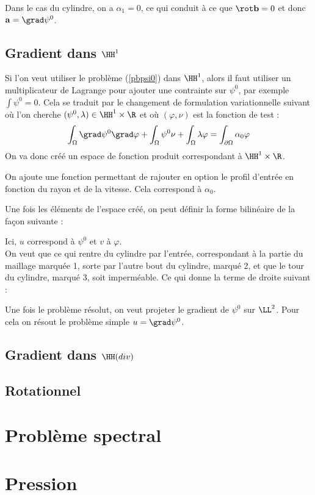 Dans le cas du cylindre, on a $\alpha_1=0$, ce qui conduit à ce que $\rot \mathbf{b}=0$ et donc $\mathbf{a}=\grad\psi^0$.

\subsection{Gradient dans $\HH^1$}
\label{gradh1}

Si l'on veut utiliser le problème (\ref{pbpsi0}) dans $\HH^1$, alors il faut utiliser un multiplicateur de Lagrange pour ajouter une contrainte sur $\psi^0$, par exemple $\int \psi^0 = 0$. Cela se traduit par le changement de formulation variationnelle suivant où l'on cherche $(\psi^0,\lambda)\in \HH^1\times\R$ et où $(\varphi,\nu)$ est la fonction de test :
\[
\int_\Omega\grad \psi^0\grad\varphi + \int_\Omega \psi^0\nu + \int_\Omega \lambda\varphi = \int_{\partial\Omega} \alpha_0\varphi
\]
On va donc créé un espace de fonction produit correspondant à $\HH^1\times\R$.



On ajoute une fonction permettant de rajouter en option le profil d'entrée en fonction du rayon et de la vitesse. Cela correspond à $\alpha_0$.



Une fois les éléments de l'espace créé, on peut définir la forme bilinéaire de la façon suivante :



Ici, $u$ correspond à $\psi^0$ et $v$ à $\varphi$.\\

On veut que ce qui rentre du cylindre par l'entrée, correspondant à la partie du maillage marquée 1, sorte par l'autre bout du cylindre, marqué 2, et que le tour du cylindre, marqué 3, soit imperméable. Ce qui donne la terme de droite suivant :



Une fois le problème résolut, on veut projeter le gradient de $\psi^0$ sur $\LL^2$. Pour cela on résout le problème simple $u=\grad\psi^0$.



\subsection{Gradient dans $\HH(div)$}

\subsection{Rotationnel}

\section{Problème spectral}

\section{Pression}


